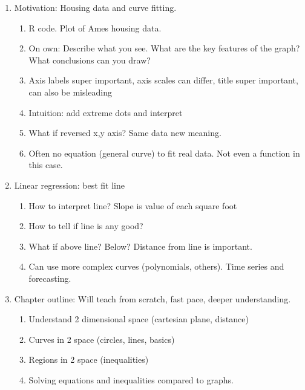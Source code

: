 \documentclass{article}
\begin{document}
\begin{enumerate}
\item Motivation: Housing data and curve fitting.
\begin{enumerate}
\item R code. Plot of Ames housing data.
\item On own: Describe what you see. What are the key features of the graph? What conclusions can you draw?
\item Axis labels super important, axis scales can differ, title super important, can also be misleading
\item Intuition: add extreme dots and interpret
\item What if reversed x,y axis? Same data new meaning.
\item Often no equation (general curve) to fit real data. Not even a function in this case.
\end{enumerate}

\item Linear regression: best fit line
\begin{enumerate}
\item How to interpret line? Slope is value of each square foot
\item How to tell if line is any good?
\item What if above line? Below? Distance from line is important.
\item Can use more complex curves (polynomials, others). Time series and forecasting.
\end{enumerate}

\item Chapter outline: Will teach from scratch, fast pace, deeper understanding.
\begin{enumerate}
\item Understand 2 dimensional space (cartesian plane, distance)
\item Curves in 2 space (circles, lines, basics)
\item Regions in 2 space (inequalities)
\item Solving equations and inequalities compared to graphs.
\end{enumerate}

\end{enumerate}
\end{document}
